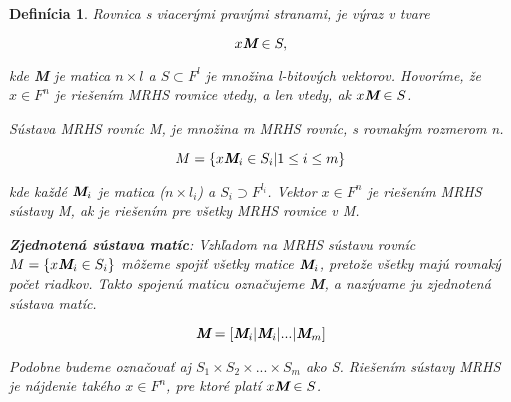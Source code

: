 \newtheorem{definition}{Definícia}
\begin{definition}
   Rovnica s viacerými pravými stranami, je výraz v tvare

\[ x \textit{\textbf{M}} \in S, \]

\noindent kde \textit{\textbf{M}} je matica \begin{math} n \times l \end{math} a \begin{math}S \subset F^l \end{math} je množina l-bitových vektorov. Hovoríme, že \begin{math} x \in F^{n} \end{math} je riešením MRHS rovnice vtedy, a len vtedy, ak \begin{math}x\textit{\textbf{M}} \in S \end{math}.

\vspace{1cm}
\noindent Sústava MRHS rovníc M, je množina m MRHS rovníc, s rovnakým rozmerom n.

\[ M = \left\{x \textit{\textbf{M}}_i \in S_i | 1 \leq i \leq m\right\} \]

\noindent kde každé \begin{math}\textit{\textbf{M}}_i\end{math} je matica (\begin{math} n \times l_i \end{math}) a \begin{math} S_i \supset
F^{l_i} \end{math}. Vektor \begin{math} x \in F^n \end{math} je riešením MRHS sústavy M, ak je riešením pre všetky MRHS rovnice v M.

\vspace{1cm}

\noindent \textbf{Zjednotená sústava matíc}: Vzhľadom na MRHS sústavu rovníc \begin{math}M = \left\{x \textit{\textbf{M}}_i \in S_i\right\} \end{math} môžeme spojiť všetky matice \begin{math}\textit{\textbf{M}}_i\end{math}, pretože všetky majú rovnaký počet riadkov. Takto spojenú maticu označujeme \textit{\textbf{M}}, a nazývame ju zjednotená sústava matíc.

\[ \textit{\textbf{M}} =[\textit{\textbf{M}}_i|\textit{\textbf{M}}_i|...|\textit{\textbf{M}}_m]\]

\noindent Podobne budeme označovať aj \begin{math}S_1 \times S_2 \times ... \times S_m\end{math} ako S. Riešením sústavy MRHS je nájdenie takého \begin{math}x \in F^n\end{math}, pre ktoré platí \begin{math}x\textit{\textbf{M}} \in S\end{math}.
\end{definition}

